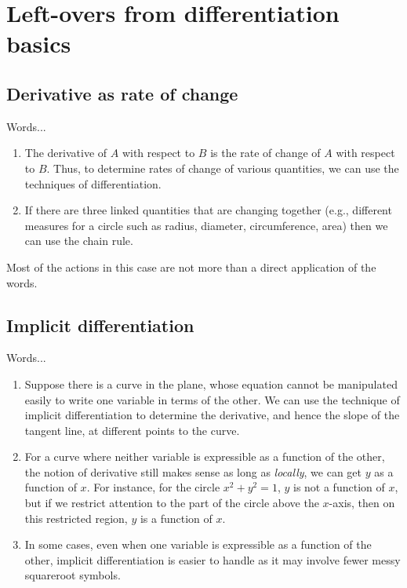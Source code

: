 \documentclass[10pt]{amsart}
\begin{document}
\section{Left-overs from differentiation basics}

\subsection{Derivative as rate of change}

Words...

\begin{enumerate}
\item The derivative of $A$ with respect to $B$ is the rate of change
  of $A$ with respect to $B$. Thus, to determine rates of change of
  various quantities, we can use the techniques of differentiation.
\item If there are three linked quantities that are changing together
  (e.g., different measures for a circle such as radius, diameter,
  circumference, area) then we can use the chain rule.
\end{enumerate}

Most of the actions in this case are not more than a direct
application of the words.

\subsection{Implicit differentiation}

Words...

\begin{enumerate}
\item Suppose there is a curve in the plane, whose equation cannot be
  manipulated easily to write one variable in terms of the other. We
  can use the technique of implicit differentiation to determine the
  derivative, and hence the slope of the tangent line, at different
  points to the curve.
\item For a curve where neither variable is expressible as a function
  of the other, the notion of derivative still makes sense as long as
  {\em locally}, we can get $y$ as a function of $x$. For instance,
  for the circle $x^2 + y^2 = 1$, $y$ is not a function of $x$, but if
  we restrict attention to the part of the circle above the $x$-axis,
  then on this restricted region, $y$ is a function of $x$.
\item In some cases, even when one variable is expressible as a
  function of the other, implicit differentiation is easier to handle
  as it may involve fewer messy squareroot symbols.
\end{enumerate}
\end{document}
